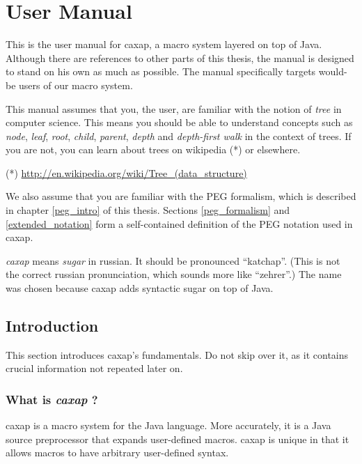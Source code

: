 \chapter{User Manual}
\label{manual}

This is the user manual for caxap, a macro system layered on top of
Java. Although there are references to other parts of this thesis, the manual is
designed to stand on his own as much as possible. The manual specifically
targets would-be users of our macro system.

This manual assumes that you, the user, are familiar with the notion of
\emph{tree} in computer science. This means you should be able to understand
concepts such as \emph{node}, \emph{leaf}, \emph{root}, \emph{child},
\emph{parent}, \emph{depth} and \emph{depth-first walk} in the context of
trees. If you are not, you can learn about trees on wikipedia (*) or elsewhere.

(*) \url{http://en.wikipedia.org/wiki/Tree_(data_structure)}

We also assume that you are familiar with the PEG formalism, which is described
in chapter \ref{peg_intro} of this thesis. Sections \ref{peg_formalism} and
\ref{extended_notation} form a self-contained definition of the PEG notation
used in caxap.

\emph{caxap} means \emph{sugar} in russian. It should be pronounced ``katchap''.
(This is not the correct russian pronunciation, which sounds more like
``zehrer''.) The name was chosen because caxap adds syntactic sugar on top of
Java.

\section{Introduction}

This section introduces caxap's fundamentals. Do not skip over it, as it
contains crucial information not repeated later on.

\subsection{What is \emph{caxap} ?}

caxap is a macro system for the Java language. More accurately, it is a Java
source preprocessor that expands user-defined macros. caxap is unique in that it
allows macros to have arbitrary user-defined syntax.

